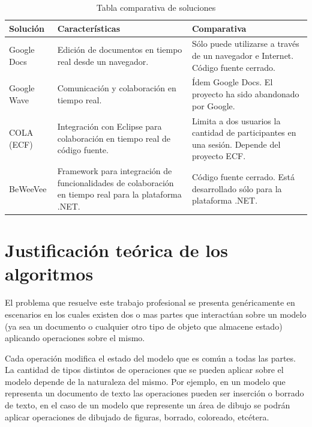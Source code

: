 \documentclass[12pt,a4paper]{article}
\begin{document}
\begin{table}[ht]
    \begin{tabular}{ | p{2.5cm} | p{5cm} | p{5cm} | }
    \hline
    Solución & Características & Comparativa \\ \hline

    Google Docs \cite{googledocs}& Edición de documentos en tiempo real desde un navegador. &
    Sólo puede utilizarse a través de un navegador e Internet. Código fuente cerrado. \\ \hline

    Google Wave \cite{googlewave} & Comunicación y colaboración en tiempo real. &
    Ídem Google Docs. El proyecto ha sido abandonado por Google. \\ \hline

    COLA \cite{cola}(ECF) & Integración con Eclipse para colaboración en tiempo real de código fuente. &
	Limita a dos usuarios la cantidad de participantes en una sesión. Depende del proyecto ECF. \\ \hline

    BeWeeVee \cite{beweevee} & Framework para integración de funcionalidades de colaboración en tiempo real para
    la plataforma .NET. & Código fuente cerrado. Está desarrollado sólo para la plataforma .NET. \\ \hline

    \end{tabular}
    \caption{\label{soluciones_comparacion} Tabla comparativa de soluciones}
\end{table}

	\section{Justificación teórica de los algoritmos}
	
	El problema que resuelve este trabajo profesional se presenta genéricamente en escenarios en los cuales 
	existen dos o mas partes que interactúan sobre un modelo (ya sea un documento o cualquier otro tipo de 
	objeto que almacene estado) aplicando operaciones sobre el mismo.
	
	Cada operación modifica el estado del modelo que es común a todas las partes. La cantidad de tipos distintos
	de operaciones que se pueden aplicar sobre el modelo depende de la naturaleza del mismo. Por ejemplo, en un
	modelo que representa un documento de texto las operaciones pueden ser inserción o borrado de texto, en el caso
	de un modelo que represente un área de dibujo se podrán aplicar operaciones de dibujado de figuras, 
	borrado, coloreado, etcétera.
	
\end{document}
